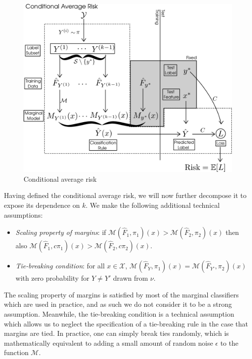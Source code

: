 \documentclass[12pt]{article}
\begin{document}

\begin{figure}[h]
\centering
\includegraphics[scale = 0.3]{extrapolation_figures/conditional_risk.png}
\caption{Conditional average risk}\label{fig:conditional_risk}
\end{figure}

Having defined the conditional average risk, we will now further
decompose it to expose its dependence on $k$.
We make the following additional technical assumptions:
\begin{itemize}
\item 
\emph{Scaling property of margins}: if $\mathcal{M}(\hat{F}_1, \pi_1)(x) >
\mathcal{M}(\hat{F}_2, \pi_2)(x)$ then also $\mathcal{M}(\hat{F}_1,
c\pi_1)(x) > \mathcal{M}(\hat{F}_2, c\pi_2)(x)$.
\item 
\emph{Tie-breaking condition}: for all $x \in \mathcal{X}$,
$\mathcal{M}(\hat{F}_Y, \pi_1)(x) = \mathcal{M}(\hat{F}_{Y'}, \pi_2)(x)$
with zero probability for $Y \neq Y'$ drawn from $\nu$.
\end{itemize}
The scaling property of margins is satisfied by most of the marginal
classifiers which are used in practice, and as such we do not consider
it to be a strong assumption.  Meanwhile, the tie-breaking condition
is a technical assumption which allows us to neglect the specification
of a tie-breaking rule in the case that margins are tied.  In
practice, one can simply break ties randomly, which is mathematically
equivalent to adding a small amount of random noise $\epsilon$ to the
function $\mathcal{M}$.
\end{document}
